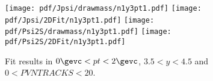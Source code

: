\begin{figure}[H]
\begin{center}
\texttt{[image: pdf/Jpsi/drawmass/n1y3pt1.pdf]}
\texttt{[image: pdf/Jpsi/2DFit/n1y3pt1.pdf]}
\vspace*{-0.5cm}
\texttt{[image: pdf/Psi2S/drawmass/n1y3pt1.pdf]}
\texttt{[image: pdf/Psi2S/2DFit/n1y3pt1.pdf]}
\vspace*{-0.5cm}
\end{center}
\caption{Fit results in $0\gevc<pt<2\gevc$, $3.5<y<4.5$ and $0<PVNTRACKS<20$.}
\label{Fitn1y3pt1}
\end{figure}
